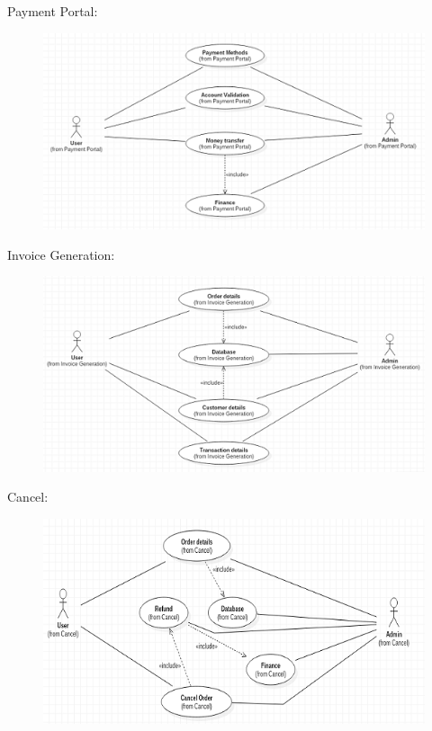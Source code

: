 \documentclass{tcc}
\begin{document}
\begin{flushleft}
\Large{{\selectfont
Payment Portal:
}}
\end{flushleft}
\begin{figure}[H]
\centering
\includegraphics{images/paymentportal.PNG}\\
\end{figure}
\newpage
\begin{flushleft}
\Large{{\selectfont
Invoice Generation:
}}
\end{flushleft}
\begin{figure}[H]
\centering
\includegraphics{images/invoicegeneration.PNG}\\
\end{figure}
\begin{flushleft}
\Large{{\selectfont
Cancel:
}}
\end{flushleft}
\begin{figure}[H]
\centering
\includegraphics{images/cancel.PNG}\\
\end{figure}
\end{document}
